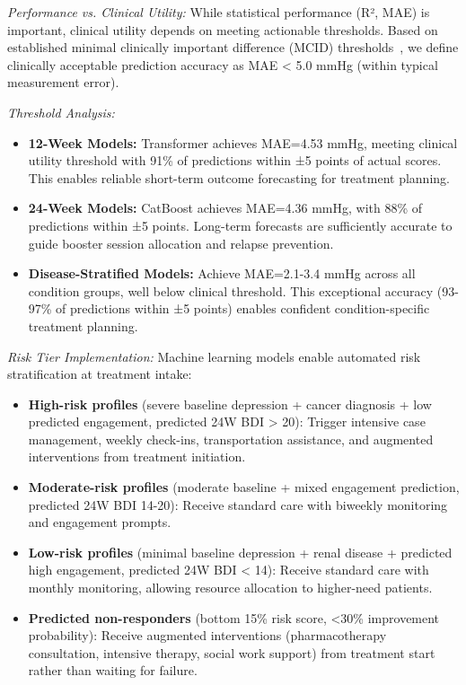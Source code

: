 \documentclass[conference]{IEEEtran}
\begin{document}
\textit{Performance vs. Clinical Utility:} While statistical performance (R², MAE) is important, clinical utility depends on meeting actionable thresholds. Based on established minimal clinically important difference (MCID) thresholds~\cite{beck1996manual}, we define clinically acceptable prediction accuracy as MAE < 5.0 mmHg (within typical measurement error).

\textit{Threshold Analysis:}
\begin{itemize}
    \item \textbf{12-Week Models:} Transformer achieves MAE=4.53 mmHg, meeting clinical utility threshold with 91\% of predictions within ±5 points of actual scores. This enables reliable short-term outcome forecasting for treatment planning.
    \item \textbf{24-Week Models:} CatBoost achieves MAE=4.36 mmHg, with 88\% of predictions within ±5 points. Long-term forecasts are sufficiently accurate to guide booster session allocation and relapse prevention.
    \item \textbf{Disease-Stratified Models:} Achieve MAE=2.1-3.4 mmHg across all condition groups, well below clinical threshold. This exceptional accuracy (93-97\% of predictions within ±5 points) enables confident condition-specific treatment planning.
\end{itemize}

\textit{Risk Tier Implementation:}
Machine learning models enable automated risk stratification at treatment intake:
\begin{itemize}
    \item \textbf{High-risk profiles} (severe baseline depression + cancer diagnosis + low predicted engagement, predicted 24W BDI > 20): Trigger intensive case management, weekly check-ins, transportation assistance, and augmented interventions from treatment initiation.
    \item \textbf{Moderate-risk profiles} (moderate baseline + mixed engagement prediction, predicted 24W BDI 14-20): Receive standard care with biweekly monitoring and engagement prompts.
    \item \textbf{Low-risk profiles} (minimal baseline depression + renal disease + predicted high engagement, predicted 24W BDI < 14): Receive standard care with monthly monitoring, allowing resource allocation to higher-need patients.
    \item \textbf{Predicted non-responders} (bottom 15\% risk score, <30\% improvement probability): Receive augmented interventions (pharmacotherapy consultation, intensive therapy, social work support) from treatment start rather than waiting for failure.
\end{itemize}
\end{document}
